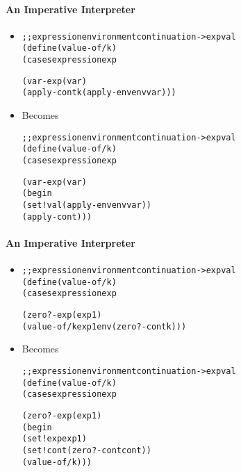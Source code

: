\documentclass{beamer}
\begin{document}
\begin{frame}[fragile]
\framesubtitle{An Imperative Interpreter}
\begin{scriptsize}
\begin{itemize}
\item<1->
\begin{alltt}
;; expression environment continuation -> expval
(define (value-of/k)
  (cases expression exp

    (var-exp (var)
             (apply-cont k (apply-env env var)))
\end{alltt}

\item<1-> Becomes
\begin{alltt}
;; expression environment continuation -> expval
(define (value-of/k)
  (cases expression exp

    (var-exp (var)
             (begin
               (set! val (apply-env env var))
               (apply-cont)))
\end{alltt}

\end{itemize}
\end{scriptsize}
\end{frame}

\begin{frame}[fragile]
\framesubtitle{An Imperative Interpreter}
\begin{scriptsize}
\begin{itemize}
\item<1->
\begin{alltt}
;; expression environment continuation -> expval
(define (value-of/k)
  (cases expression exp

    (zero?-exp (exp1)
               (value-of/k exp1 env (zero?-cont k)))
\end{alltt}

\item<1-> Becomes
\begin{alltt}
;; expression environment continuation -> expval
(define (value-of/k)
  (cases expression exp

    (zero?-exp (exp1)
               (begin
                 (set! exp exp1)
                 (set! cont (zero?-cont cont))
                 (value-of/k)))
\end{alltt}

\end{itemize}
\end{scriptsize}
\end{frame}
\end{document}
